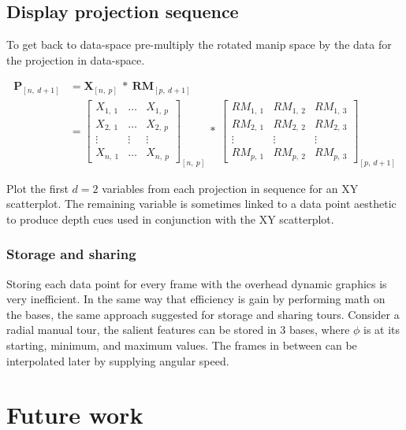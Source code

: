 \documentclass{monashthesis}
\begin{document}
\section{Display projection sequence}\label{display-projection-sequence}

To get back to data-space pre-multiply the rotated manip space by the
data for the projection in data-space.

\begin{align}
  \textbf{P}_{[n,~d+1]}
    &= \textbf{X}_{[n,~p]} ~*~ \textbf{RM}_{[p,~d+1]} \\
    &=
      \begin{bmatrix}
          X_{1,~1} & \dots & X_{1,~p} \\
          X_{2,~1} & \dots & X_{2,~p} \\
          \vdots   & \vdots & \vdots  \\
          X_{n,~1} & \dots & X_{n,~p}
      \end{bmatrix}_{[n,~p]}
      ~*~
      \begin{bmatrix}
        RM_{1,~1} & RM_{1,~2} & RM_{1,~3} \\
        RM_{2,~1} & RM_{2,~2} & RM_{2,~3} \\
        \vdots    & \vdots    & \vdots    \\
        RM_{p,~1} & RM_{p,~2} & RM_{p,~3}
      \end{bmatrix}_{[p,~d+1]}
\end{align}

Plot the first \(d=2\) variables from each projection in sequence for an
XY scatterplot. The remaining variable is sometimes linked to a data
point aesthetic to produce depth cues used in conjunction with the XY
scatterplot.

\subsection{Storage and sharing}\label{storage-and-sharing}

Storing each data point for every frame with the overhead dynamic
graphics is very inefficient. In the same way that efficiency is gain by
performing math on the bases, the same approach suggested for storage
and sharing tours. Consider a radial manual tour, the salient features
can be stored in 3 bases, where \(\phi\) is at its starting, minimum,
and maximum values. The frames in between can be interpolated later by
supplying angular speed.

\chapter{Future work}\label{ch:future_work}
\end{document}
